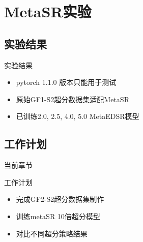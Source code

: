 \section{MetaSR实验}

\subsection{实验结果}

\begin{frame}{实验结果} 
    \begin{itemize}
        \item pytorch 1.1.0 版本只能用于测试
        \item 原始GF1-S2超分数据集适配MetaSR
        \item 已训练2.0, 2.5, 4.0, 5.0 MetaEDSR模型
    \end{itemize}
\end{frame}

\subsection{工作计划}
\begin{frame}{当前章节}
\end{frame}

\begin{frame}{工作计划}
    \begin{itemize}
        \item 完成GF2-S2超分数据集制作
        \item 训练metaSR 10倍超分模型
        \item 对比不同超分策略结果
    \end{itemize}
\end{frame}


